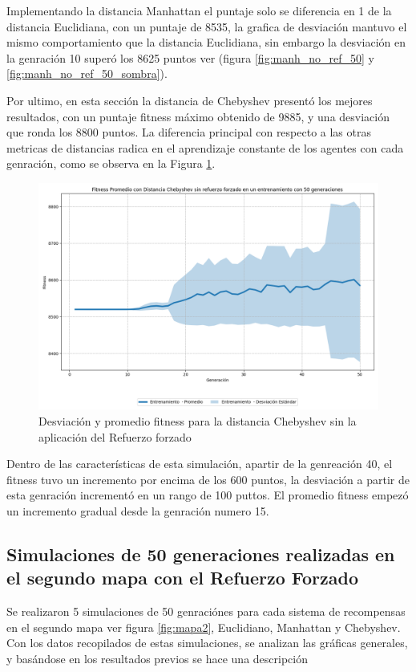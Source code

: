 \documentclass[conference]{IEEEtran}
\begin{document}
Implementando la distancia Manhattan el puntaje solo se diferencia en 1 de la distancia Euclidiana, con un puntaje de 8535, la grafica de desviación mantuvo el mismo comportamiento que la distancia Euclidiana, sin embargo la desviación en la genración 10 superó los 8625 puntos ver (figura \ref{fig:manh_no_ref_50} y \ref{fig:manh_no_ref_50_sombra}).

Por ultimo, en esta sección la distancia de Chebyshev presentó los mejores resultados, con un puntaje fitness máximo obtenido de 9885, y una desviación que ronda los 8800 puntos. La diferencia principal con respecto a las otras metricas de distancias radica en el aprendizaje constante de los agentes con cada genración, como se observa en la Figura \ref{fig:no_refoice_chy_desv}.
\begin{figure}[H]
    \centering
    \includegraphics[width=0.9\linewidth]{Sin_Refuerzo_50Gen/Cheby_NoRef_50Gen_Sombra.png}
    \caption{Desviación y promedio fitness para la distancia Chebyshev sin la aplicación del Refuerzo forzado}
    \label{fig:no_refoice_chy_desv}
\end{figure}
Dentro de las características de esta simulación, apartir de la genreación 40, el fitness tuvo un incremento por encima de los 600 puntos, la desviación a partir de esta genración incrementó en un rango de 100 puttos. El promedio fitness empezó un incremento gradual desde la genración numero 15. 

\subsection{Simulaciones de 50 generaciones realizadas en el segundo mapa con el Refuerzo Forzado}
Se realizaron 5 simulaciones de 50 genraciónes para cada sistema de recompensas en el segundo mapa ver figura \ref{fig:mapa2}, Euclidiano, Manhattan y Chebyshev. Con los datos recopilados de estas simulaciones, se analizan las gráficas generales, y basándose en los resultados previos se hace una descripción
\end{document}
